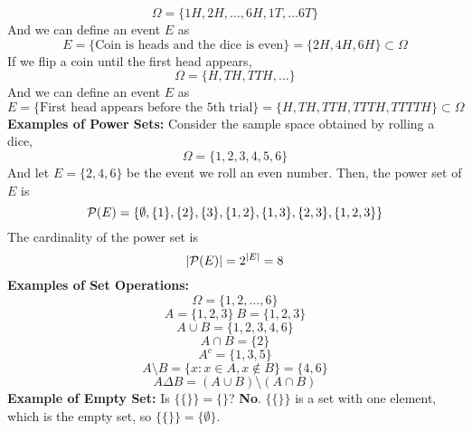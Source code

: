 \[\Omega = \{1H, 2H, \ldots, 6H, 1T, \ldots 6T\}\]
And we can define an event $E$ as 
\[E = \{\text{Coin is heads and the dice is even}\} = \{2H, 4H, 6H\} \subset \Omega\]
If we flip a coin until the first head appears, 
\[\Omega = \{H, TH, TTH, \ldots\}\]
And we can define an event $E$ as
\[E = \{\text{First head appears before the 5th trial}\} = \{H, TH, TTH, TTTH, TTTTH\} \subset \Omega\]
\textbf{Examples of Power Sets:} Consider the sample space obtained by rolling a dice,
\[\Omega = \{1,2,3,4,5,6\}\]
And let $E = \{2,4,6\}$ be the event we roll an even number. Then, the power set of $E$ is 
\[\mathcal{P}(E) = \{\emptyset, \{1\}, \{2\}, \{3\}, \{1, 2\}, \{1, 3\}, \{2,3\}, \{1,2,3\}\}\]
The cardinality of the power set is 
\[|\mathcal{P}(E)| = 2^{|E|} = 8\]
\noindent
\textbf{Examples of Set Operations:}
\[\Omega = \{1,2,\ldots, 6\}\]
\[A = \{1,2,3\} \ B = \{1,2, 3\}\]
\[A \cup B = \{1,2,3,4,6\}\]
\[A \cap B = \{2\}\]
\[A^c = \{1,3,5\}\]
\[A \setminus B = \{x: x \in A, x \not\in B\} = \{4,6\}\]
\[A \Delta B = (A \cup B) \setminus (A \cap B)\]
\textbf{Example of Empty Set:}
Is $\{\{\}\} = \{\}$? \textbf{No}. $\{\{\}\}$ is a set with one element, which is the empty set, so $\{\{\}\} = \{\emptyset\}$.\\
